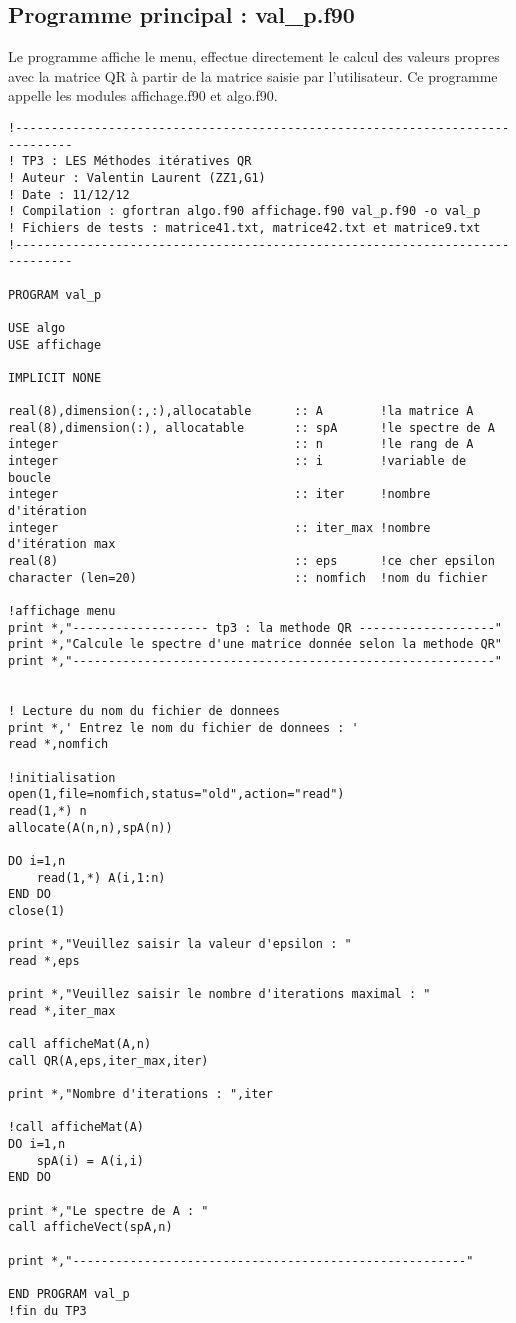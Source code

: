 \documentclass{report}
\begin{document}
\subsection{Programme principal : val\_p.f90}
Le programme affiche le menu, effectue directement le calcul des valeurs propres avec la matrice QR à partir de
la matrice saisie par l'utilisateur. Ce programme appelle les modules affichage.f90 et algo.f90.

\begin{small}
\begin{verbatim}
!------------------------------------------------------------------------------
! TP3 : LES Méthodes itératives QR
! Auteur : Valentin Laurent (ZZ1,G1)
! Date : 11/12/12
! Compilation : gfortran algo.f90 affichage.f90 val_p.f90 -o val_p
! Fichiers de tests : matrice41.txt, matrice42.txt et matrice9.txt
!------------------------------------------------------------------------------

PROGRAM val_p

USE algo
USE affichage

IMPLICIT NONE

real(8),dimension(:,:),allocatable      :: A        !la matrice A
real(8),dimension(:), allocatable       :: spA      !le spectre de A
integer                                 :: n        !le rang de A
integer                                 :: i        !variable de boucle
integer                                 :: iter     !nombre d'itération
integer                                 :: iter_max !nombre d'itération max
real(8)                                 :: eps      !ce cher epsilon
character (len=20)                      :: nomfich  !nom du fichier

!affichage menu
print *,"------------------- tp3 : la methode QR -------------------"
print *,"Calcule le spectre d'une matrice donnée selon la methode QR"
print *,"-----------------------------------------------------------"


! Lecture du nom du fichier de donnees
print *,' Entrez le nom du fichier de donnees : '
read *,nomfich

!initialisation
open(1,file=nomfich,status="old",action="read")
read(1,*) n
allocate(A(n,n),spA(n))

DO i=1,n
    read(1,*) A(i,1:n)
END DO
close(1)

print *,"Veuillez saisir la valeur d'epsilon : "
read *,eps

print *,"Veuillez saisir le nombre d'iterations maximal : "
read *,iter_max

call afficheMat(A,n)
call QR(A,eps,iter_max,iter)

print *,"Nombre d'iterations : ",iter

!call afficheMat(A)
DO i=1,n
    spA(i) = A(i,i)
END DO

print *,"Le spectre de A : "
call afficheVect(spA,n)

print *,"-------------------------------------------------------"

END PROGRAM val_p
!fin du TP3\end{verbatim}
\end{small}
\end{document}
